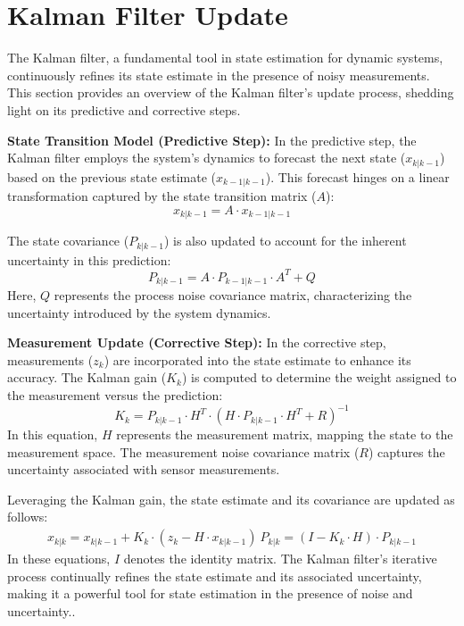 \section{Kalman Filter Update}
\label{sec:kf}
The Kalman filter, a fundamental tool in state estimation for dynamic systems, continuously refines its state estimate in the presence of noisy measurements. This section provides an overview of the Kalman filter's update process, shedding light on its predictive and corrective steps.

\textbf{State Transition Model (Predictive Step):}
In the predictive step, the Kalman filter employs the system's dynamics to forecast the next state ($x_{k|k-1}$) based on the previous state estimate ($x_{k-1|k-1}$). This forecast hinges on a linear transformation captured by the state transition matrix ($A$):
\begin{equation*}
x_{k|k-1} = A \cdot x_{k-1|k-1}
\end{equation*}

The state covariance ($P_{k|k-1}$) is also updated to account for the inherent uncertainty in this prediction:
\begin{equation*}
P_{k|k-1} = A \cdot P_{k-1|k-1} \cdot A^T + Q
\end{equation*}
Here, $Q$ represents the process noise covariance matrix, characterizing the uncertainty introduced by the system dynamics.

\textbf{Measurement Update (Corrective Step):}
In the corrective step, measurements ($z_k$) are incorporated into the state estimate to enhance its accuracy. The Kalman gain ($K_k$) is computed to determine the weight assigned to the measurement versus the prediction:
\begin{equation*}
K_k = P_{k|k-1} \cdot H^T \cdot (H \cdot P_{k|k-1} \cdot H^T + R)^{-1}
\end{equation*}
In this equation, $H$ represents the measurement matrix, mapping the state to the measurement space. The measurement noise covariance matrix ($R$) captures the uncertainty associated with sensor measurements.

Leveraging the Kalman gain, the state estimate and its covariance are updated as follows:
\begin{align*}
x_{k|k} = x_{k|k-1} + K_k \cdot (z_k - H \cdot x_{k|k-1}) \
P_{k|k} = (I - K_k \cdot H) \cdot P_{k|k-1}
\end{align*}
In these equations, $I$ denotes the identity matrix. The Kalman filter's iterative process continually refines the state estimate and its associated uncertainty, making it a powerful tool for state estimation in the presence of noise and uncertainty..

